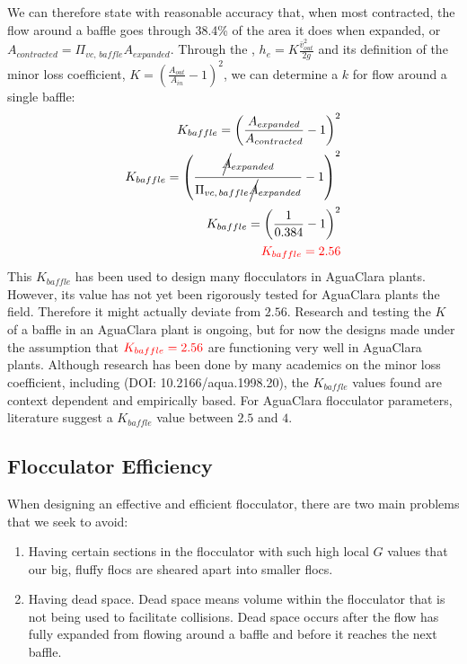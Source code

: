 \documentclass[letterpaper,10pt,english]{sphinxmanual}
\begin{document}
We can therefore state with reasonable accuracy that, when most contracted, the flow around a baffle goes through 38.4\% of the area it does when expanded, or \(A_{contracted} = \Pi_{vc, \, baffle} A_{expanded}\). Through the , \(h_e = K \frac{\bar v_{out}^2}{2g}\) and its definition of the minor loss coefficient, \(K = \left( \frac{A_{out}}{A_{in}} -1 \right)^2\), we can determine a \(k\) for flow around a single baffle:
\begin{align}\label{equation:Flocculation/Floc_Design:Flocculation/Floc_Design:7}\!\begin{aligned}
K_{baffle} = \left( \frac{A_{expanded}}{A_{contracted}} -1 \right)^2\\
K_{baffle} = \left( \frac{\rlap{\Big/} A_{expanded}}{\Pi_{vc, \, baffle} \rlap{\Big/} A_{expanded}} -1 \right)^2\\
K_{baffle} = \left( \frac{1}{0.384} -1 \right)^2\\
\color{red}{K_{baffle} = 2.56}\\
\end{aligned}\end{align}
This \(K_{baffle}\) has been used to design many flocculators in AguaClara plants. However, its value has not yet been rigorously tested for AguaClara plants the field. Therefore it might actually deviate from \(2.56\). Research and testing the \(K\) of a baffle in an AguaClara plant is ongoing, but for now the designs made under the assumption that \(\color{red}{K_{baffle} = 2.56}\) are functioning very well in AguaClara plants. Although research has been done by many academics on the minor loss coefficient, including   (DOI: 10.2166/aqua.1998.20), the \(K_{baffle}\) values found are context dependent and empirically based. For AguaClara flocculator parameters, literature suggest a \(K_{baffle}\) value between \(2.5\) and \(4\).


\subsection{Flocculator Efficiency}
\label{\detokenize{Flocculation/Floc_Design:flocculator-efficiency}}
When designing an effective and efficient flocculator, there are two main problems that we seek to avoid:
\begin{enumerate}
\item {} 
Having certain sections in the flocculator with such high local \(G\) values that our big, fluffy flocs are sheared apart into smaller flocs.

\item {} 
Having dead space. Dead space means volume within the flocculator that is not being used to facilitate collisions. Dead space occurs after the flow has fully expanded from flowing around a baffle and before it reaches the next baffle.

\end{enumerate}
\end{document}
